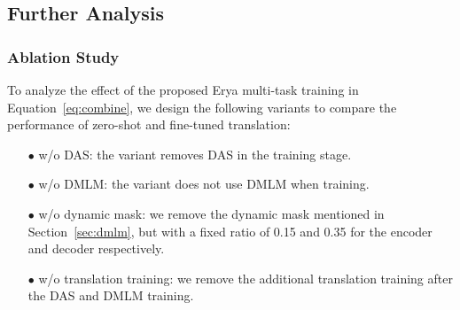     



\subsection{Further Analysis}
\subsubsection{Ablation Study}

To analyze the effect of the proposed Erya multi-task training in Equation~\ref{eq:combine}, we design the following variants to compare the performance of zero-shot and fine-tuned translation: 

\begin{itemize}[leftmargin=*]
\itemsep0em 
\item[$\bullet$] w/o DAS: the variant removes DAS in the training stage.
\item[$\bullet$] w/o DMLM: the variant does not use DMLM when training.
\item[$\bullet$] w/o dynamic mask: we remove the dynamic mask mentioned in Section~\ref{sec:dmlm}, but with a fixed ratio of 0.15 and 0.35 for the encoder and decoder respectively.
\item[$\bullet$] w/o translation training: we remove the additional translation training after the DAS and DMLM training.

\end{itemize}

